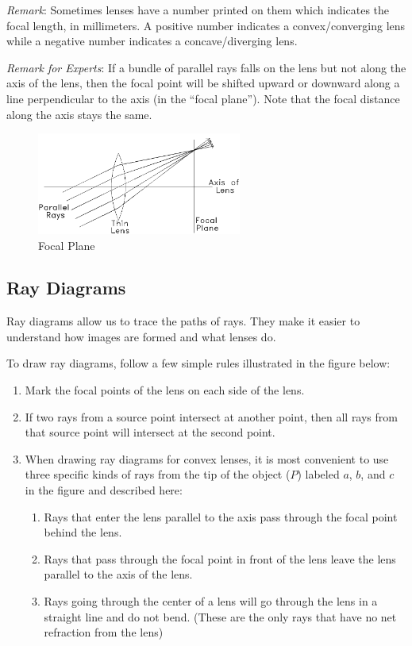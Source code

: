 \emph{Remark}: Sometimes lenses have a number printed on them which indicates the focal length, in millimeters. A positive number indicates a convex/converging lens while a negative number indicates a concave/diverging lens.\myskip

\emph{Remark for Experts}:  If a bundle of parallel rays falls on the lens but not along the axis of the lens, then the focal point will be shifted upward or downward along a line perpendicular to the axis (in the ``focal plane''). Note that the focal distance along the axis stays the same.
\begin{figure}[h]
\centering
\includegraphics[width=0.6\textwidth]{./Exp6/pic/image2.png}
\caption{Focal Plane}
\end{figure}

\subsection{Ray Diagrams}
Ray diagrams allow us to trace the paths of rays. They make it easier to understand how images are formed and what lenses do. \myskip

To draw ray diagrams, follow a few simple rules illustrated in the figure below:
\begin{enumerate}
  \item Mark the focal points of the lens on each side of the lens.
  \item If two rays from a source point intersect at another point, then all rays from that source point will intersect at the second point.
  \item When drawing ray diagrams for convex lenses, it is most convenient to use three specific kinds of rays from the tip of the object ($P$) labeled $a$, $b$, and $c$ in the figure and described here:
  \begin{enumerate}
    \item Rays that enter the lens parallel to the axis pass through the focal point behind the lens.
    \item Rays that pass through the focal point in front of the lens leave the lens parallel to the axis of the lens.
    \item Rays going through the center of a lens will go through the lens in a straight line and do not bend. (These are the only rays that have no net refraction from the lens)
  \end{enumerate}
\end{enumerate}


